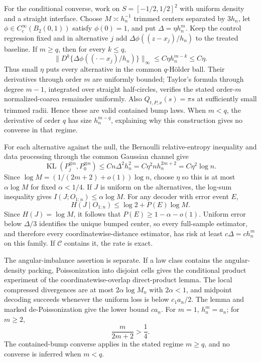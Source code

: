 For the conditional converse, work on \(S=[-1/2,1/2]^2\) with uniform density and a straight interface.  Choose \(M\asymp h_n^{-1}\) trimmed centers separated by \(3h_n\), let \(\phi\in C_c^\infty(B_2(0,1))\) satisfy \(\phi(0)=1\), and put \(\Delta=\eta h_n^m\).  Keep the control regression fixed and in alternative \(j\) add \(\Delta\phi((z-x_j)/h_n)\) to the treated baseline.  If \(m\geq q\), then for every \(k\leq q\),
\[
 \|D^k\{\Delta\phi((\cdot-x_j)/h_n)\}\|_\infty
 \leq C\eta h_n^{m-k}\leq C\eta.
\]
Thus small \(\eta\) puts every alternative in the common \(q\)-H\"older ball.  Their derivatives through order \(m\) are uniformly bounded; Taylor's formula through degree \(m-1\), integrated over straight half-circles, verifies the stated order-\(m\) normalized-coarea remainder uniformly.  Also \(Q_{t,P,x}(s)=\pi s\) at sufficiently small trimmed radii.  Hence these are valid contained bump laws.  When \(m<q\), the derivative of order \(q\) has size \(h_n^{m-q}\), explaining why this construction gives no converse in that regime.

For each alternative against the null, the Bernoulli relative-entropy inequality and data processing through the common Gaussian channel give
\[
 \operatorname{KL}(P_j^{\otimes n},P_0^{\otimes n})
 \leq Cn\Delta^2h_n^2
 =C\eta^2nh_n^{2m+2}=C\eta^2\log n.
\]
Since \(\log M=(1/(2m+2)+o(1))\log n\), choose \(\eta\) so this is at most \(\alpha\log M\) for fixed \(\alpha<1/4\).  If \(J\) is uniform on the alternatives, the log-sum inequality gives \(I(J;O_{1:n})\leq\alpha\log M\).  For any decoder with error event \(E\),
\[
 H(J\mid O_{1:n})\leq\log2+P(E)\log M.
\]
Since \(H(J)=\log M\), it follows that \(P(E)\geq1-\alpha-o(1)\).  Uniform error below \(\Delta/3\) identifies the unique bumped center, so every full-sample estimator, and therefore every coordinatewise-distance estimator, has risk at least \(c\Delta=ch_n^m\) on this family.  If \(\mathcal C\) contains it, the rate is exact.

The angular-imbalance assertion is separate.  If a law class contains the angular-density packing, Poissonization into disjoint cells gives the conditional product experiment of the coordinatewise-overlap direct-product lemma.  The local compressed divergences are at most \(2\alpha\log M_n\) with \(2\alpha<1\), and midpoint decoding succeeds whenever the uniform loss is below \(c_1a_n/2\).  The lemma and marked de-Poissonization give the lower bound \(ca_n\).  For \(m=1\), \(h_n^m=a_n\); for \(m\geq2\),
\[
 \frac{m}{2m+2}>\frac14.
\]
The contained-bump converse applies in the stated regime \(m\geq q\), and no converse is inferred when \(m<q\).

